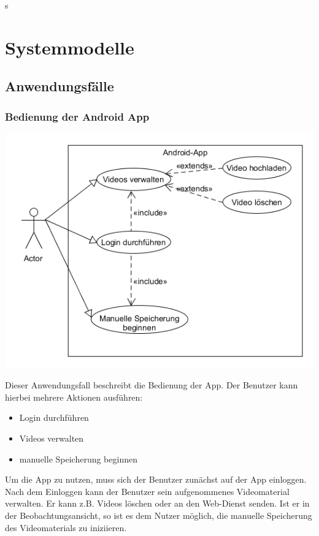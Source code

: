 s\chapter{Systemmodelle}
\section{Anwendungsfälle}
\subsection{Bedienung der Android App}
\begin{center}
\includegraphics[width=1\textwidth]{subtopicsFuncspec/Res/systemModels/App-AFD-UML.png}
\end{center}
Dieser Anwendungsfall beschreibt die Bedienung der \gls{App}. 
Der Benutzer kann hierbei mehrere Aktionen ausführen:
\begin{itemize}
\itemsep0pt
\item Login durchführen
\item Videos verwalten
\item manuelle Speicherung beginnen
\end{itemize}
Um die \gls{App} zu nutzen, muss sich der Benutzer zunächst auf der \gls{App} einloggen. Nach dem Einloggen kann der Benutzer sein aufgenommenes Videomaterial verwalten. Er kann z.B. Videos löschen oder an den \gls{Web-Dienst} senden.
Ist er in der Beobachtungsansicht, so ist es dem Nutzer möglich, die manuelle Speicherung des Videomaterials zu iniziieren.

